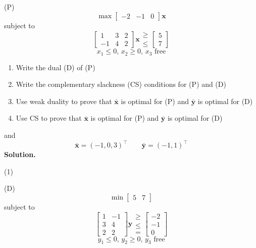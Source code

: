 \begin{exbox}
    \begin{example}
        (P)
        \[ \max
            \begin{bmatrix}
                -2 & -1 & 0
            \end{bmatrix}\bm{x} \]
        subject to
        \[
            \begin{bmatrix}
                1  & 3 & 2 \\
                -1 & 4 & 2
            \end{bmatrix}\bm{x}
            \begin{matrix}
                \geqslant \\
                \le
            \end{matrix}
            \begin{bmatrix}
                5 \\
                7
            \end{bmatrix}\]
        \[ x_1\leqslant 0,\,x_2\geqslant  0,\,x_3\text{ free} \]
        \begin{enumerate}[(1)]
            \item Write the dual (D) of (P)
            \item Write the complementary slackness (CS) conditions for (P) and (D)
            \item Use weak duality to prove that $ \bm{\bar{x}} $ is optimal for (P)
                  and $ \bm{\bar{y}} $ is optimal for (D)
            \item Use CS to prove that $ \bm{\bar{x}} $ is optimal for (P) and
                  $ \bm{\bar{y}} $ is optimal for (D)
        \end{enumerate}
        and
        \[ \bm{\bar{x}}=(-1,0,3)^\top\qquad \bm{\bar{y}}=(-1,1)^\top \]
        \textbf{Solution.}

        (1)

        (D)
        \[ \min
            \begin{bmatrix}
                5 & 7
            \end{bmatrix} \]
        subject to
        \[
            \begin{bmatrix}
                1 & -1 \\
                3 & 4  \\
                2 & 2
            \end{bmatrix}\bm{y}
            \begin{matrix}
                \geqslant \\
                \le       \\
                =
            \end{matrix}
            \begin{bmatrix}
                -2 \\
                -1 \\
                0
            \end{bmatrix}\]
        \[ y_1\leqslant 0,\,y_2\geqslant  0,\,y_3\text{ free} \]


\end{example}
\end{exbox}
